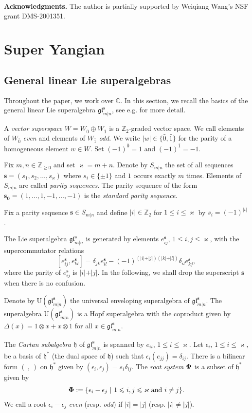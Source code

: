 \documentclass[11pt,reqno]{amsart}
\numberwithin{equation}{section}
\theoremstyle{definition}
\theoremstyle{remark}
\newcommand{\gl}{\mathfrak{gl}}
\newcommand{\h}{\mathfrak{h}}
\newcommand{\bC}{\mathbb{C}}
\newcommand{\bZ}{\mathbb{Z}}
\newcommand{\gge}{\geqslant}
\newcommand{\lle}{\leqslant}
\newcommand{\glMN}{\mathfrak{gl}_{m|n}^{\bm s}}
\newcommand{\UglMN}{\mathrm{U}(\mathfrak{gl}_{m|n}^\s)}
\newcommand{\ka}{\varkappa}
\newcommand{\s}{{\bm s}}
\begin{document}
\medskip

{\bf Acknowledgments.} The author is partially supported by Weiqiang Wang's NSF grant DMS-2001351. 

\section{Super Yangian}\label{sec:super yangian}
\subsection{General linear Lie superalgebras}\label{sec glmn}
Throughout the paper, we work over $\bC$. In this section, we recall the basics of the general linear Lie superalgebra $\glMN$, see e.g. \cite{Cheng2009dualities} for more detail.%

A \textit{vector superspace} $W = W_{\bar 0}\oplus W_{\bar 1}$ is a $\bZ_2$-graded vector space. We call elements of $W_{\bar 0}$ \textit{even} and elements of
$W_{\bar 1}$ \textit{odd}. We write $\vert w\vert \in\{\bar 0,\bar 1\}$ for the parity of a homogeneous element $w\in W$. Set $(-1)^{\bar 0}=1$ and $(-1)^{\bar 1}=-1$.

Fix $m,n\in \bZ_{\gge 0}$ and set $\ka=m+n$. Denote by $S_{m\vert n}$ the set of all sequences $\bm s=(s_{1},s_2,\dots,s_{\ka})$ where $s_i\in\{\pm1\}$ and $1$ occurs exactly $m$ times. Elements of $S_{m\vert n}$ are called \textit{parity sequences}. The parity sequence of the form $\bm{s_0}=(1,\dots,1,-1,\dots,-1)$ is the \textit{standard parity sequence}.

Fix a parity sequence $\s\in S_{m\vert n}$ and define $\vert i\vert \in \bZ_2$ for $1\lle i \lle \ka$ by $s_i=(-1)^{\vert i\vert }$.

The Lie superalgebra $\glMN$ is generated by elements $e_{ij}^\s$, $1\lle i,j\lle \ka$, with the supercommutator relations
\[
[e^\s_{ij},e^\s_{kl}]=\delta_{jk}e^\s_{il}-(-1)^{(\vert i\vert +\vert j\vert )(\vert k\vert +\vert l\vert )}\delta_{il}e^\s_{kj},
\]
where the parity of $e_{ij}^\s$ is $\vert i\vert +\vert j\vert $. In the following, we shall drop the superscript $\s$ when there is no confusion.

Denote by $\UglMN$ the universal enveloping superalgebra of $\glMN$. The superalgebra $\UglMN$ is a Hopf superalgebra with the coproduct given by $\Delta(x)=1\otimes x+x\otimes 1$ for all $x\in \glMN$.

The \textit{Cartan subalgebra $\h$} of $\glMN$ is spanned by $e_{ii}$, $1\lle i \lle \ka$. Let $\epsilon_i$, $1\lle i \lle \ka$, be a basis of $\h^*$ (the dual space of $\h$) such that $\epsilon_i(e_{jj})=\delta_{ij}$. There is a bilinear form $(\ ,\ )$ on $\h^*$ given by $(\epsilon_i,\epsilon_j)=s_i\delta_{ij}$. The \textit{root system $\bf{\Phi}$} is a subset of $\h^*$ given by
\[
{\bf \Phi}:=\{\epsilon_i-\epsilon_j~\vert ~1\lle i,j\lle \ka \text{ and }i\ne j\}.
\]
We call a root $\epsilon_i-\epsilon_j$ \textit{even} (resp. \textit{odd}) if $\vert i\vert =\vert j\vert $ (resp. $\vert i\vert \ne \vert j\vert $).
\end{document}
